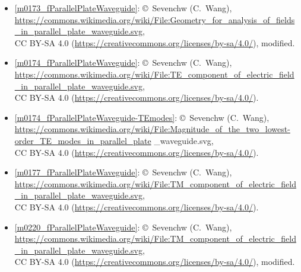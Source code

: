 \begin{itemize}

\item[Fig.] \label{m0173_fParallelPlateWaveguide_Credit}
  \ref{m0173_fParallelPlateWaveguide}:
  \copyright~Sevenchw (C.\ Wang), 
  \url{https://commons.wikimedia.org/wiki/File:Geometry_for_analysis_of_fields_in_parallel_plate_waveguide.svg},\\ 
  CC BY-SA 4.0 (\url{https://creativecommons.org/licenses/by-sa/4.0/}), modified.

\item[Fig.] \label{m0174_fParallelPlateWaveguide_Credit}
  \ref{m0174_fParallelPlateWaveguide}:
  \copyright~Sevenchw (C.\ Wang), 
  \url{https://commons.wikimedia.org/wiki/File:TE_component_of_electric_field_in_parallel_plate_waveguide.svg},\\ 
  CC BY-SA 4.0 (\url{https://creativecommons.org/licenses/by-sa/4.0/}).

\item[Fig.] \label{m0174_fParallelPlateWaveguide-TEmodes_Credit}
  \ref{m0174_fParallelPlateWaveguide-TEmodes}:
  \copyright~Sevenchw (C.\ Wang), 
  \href{https://commons.wikimedia.org/wiki/File:Magnitude_of_the_two_lowest-order_TE_modes_in_parallel_plate_waveguide.svg}{https://commons.wikimedia.org/wiki/File:Magnitude\_of\_the\_two\_lowest-order\_TE\_modes\_in\_parallel\_plate} \_waveguide.svg,\\ 
  CC BY-SA 4.0 (\url{https://creativecommons.org/licenses/by-sa/4.0/}).

\item[Fig.] \label{m0177_fParallelPlateWaveguide_Credit}
  \ref{m0177_fParallelPlateWaveguide}:
  \copyright~Sevenchw (C.\ Wang), 
  \url{https://commons.wikimedia.org/wiki/File:TM_component_of_electric_field_in_parallel_plate_waveguide.svg},\\ 
  CC BY-SA 4.0 (\url{https://creativecommons.org/licenses/by-sa/4.0/}).

\item[Fig.] \label{m0220_fParallelPlateWaveguide_Credit}
  \ref{m0220_fParallelPlateWaveguide}:
  \copyright~Sevenchw (C.\ Wang), 
  \url{https://commons.wikimedia.org/wiki/File:TM_component_of_electric_field_in_parallel_plate_waveguide.svg},\\ 
  CC BY-SA 4.0 (\url{https://creativecommons.org/licenses/by-sa/4.0/}),
  modified.

\end{itemize}

\twocolumn

